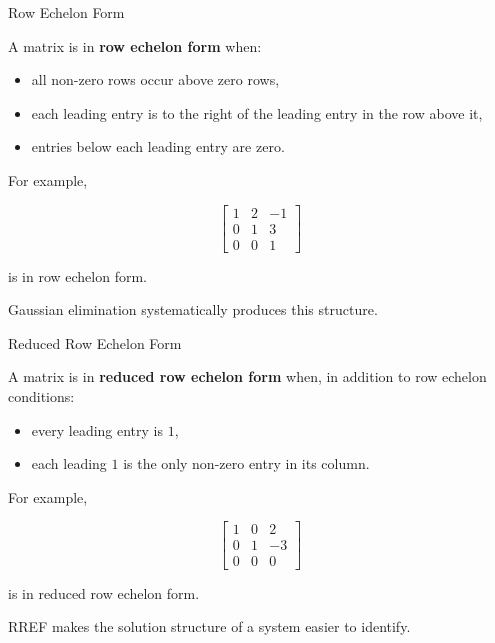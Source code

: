
\begin{frame}{Row Echelon Form}

A matrix is in \textbf{row echelon form} when:

\begin{itemize}
    \item all non-zero rows occur above zero rows,
    \item each leading entry is to the right of the leading
    entry in the row above it,
    \item entries below each leading entry are zero.
\end{itemize}

For example,

\[
\begin{bmatrix}
1&2&-1\\
0&1&3\\
0&0&1
\end{bmatrix}
\]

is in row echelon form.

\vspace{0.4cm}

Gaussian elimination systematically produces this structure.

\end{frame}



\begin{frame}{Reduced Row Echelon Form}

A matrix is in \textbf{reduced row echelon form} when, in addition
to row echelon conditions:

\begin{itemize}
    \item every leading entry is $1$,
    \item each leading $1$ is the only non-zero entry in its column.
\end{itemize}

For example,

\[
\boxed{
\begin{bmatrix}
1&0&2\\
0&1&-3\\
0&0&0
\end{bmatrix}
}
\]

is in reduced row echelon form.

\vspace{0.3cm}

RREF makes the solution structure of a system easier to identify.

\end{frame}


